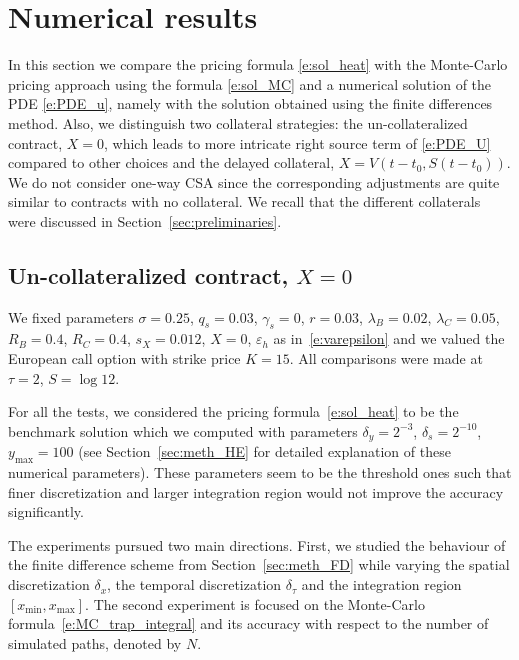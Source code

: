 \documentclass[a4paper,10pt]{article}
\newcommand{\1}{\mathbf{1}}
\begin{document}
{%
\section{Numerical results}\label{sec:results}

In this section we compare the pricing formula \eqref{e:sol_heat} with the Monte-Carlo pricing approach using the formula \eqref{e:sol_MC} and a numerical solution of the PDE \eqref{e:PDE_u}, namely with the solution obtained using the finite differences method. Also, we distinguish two collateral strategies: the un-collateralized contract, $X=0$, which leads to more intricate right source term of \eqref{e:PDE_U} compared to other choices and the delayed collateral, $X=V(t-t_0,S(t-t_0))$. We do not consider one-way CSA since the corresponding adjustments are quite similar to contracts with no collateral. We recall that the different collaterals were discussed in Section~\ref{sec:preliminaries}.


\subsection{Un-collateralized contract, \texorpdfstring{$X=0$}{X=0}}

We fixed parameters $\sigma = 0.25$, $q_s = 0.03$, $\gamma_s = 0$, $r=0.03$, $\lambda_B = 0.02$, $\lambda_C = 0.05$, $R_B = 0.4$, $R_C = 0.4$, $s_X = 0.012$, $X=0$, $\varepsilon_h$ as in~\eqref{e:varepsilon} and we valued the European call option with strike price $K=15$. All comparisons were made at $\tau = 2$, $S = \log{12}$.

For all the tests, we considered the pricing formula~\eqref{e:sol_heat} to be the benchmark solution which we computed with parameters $\delta_y = 2^{-3}$, $\delta_s = 2^{-10}$, $y_\mathrm{max} = 100$ (see Section~\ref{sec:meth_HE} for detailed explanation of these numerical parameters). These parameters seem to be the threshold ones such that finer discretization and larger integration region would not improve the accuracy significantly. 

The experiments pursued two main directions. First, we studied the behaviour of the finite difference scheme from Section~\ref{sec:meth_FD} while varying the spatial discretization $\delta_x$, the temporal discretization $\delta_\tau$ and the integration region $[x_\mathrm{min}, x_\mathrm{max}]$. The second experiment is focused on the Monte-Carlo formula~\eqref{e:MC_trap_integral} and its accuracy with respect to the number of simulated paths, denoted by $N$. 

}
\end{document}
